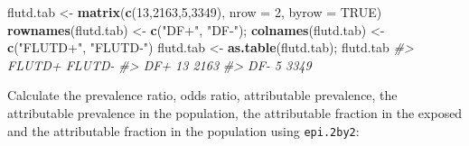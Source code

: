 \documentclass[
]{article}
\newenvironment{Shaded}{\begin{snugshade}}{\end{snugshade}}
\newcommand{\CommentTok}[1]{\textcolor[rgb]{0.56,0.35,0.01}{\textit{#1}}}
\newcommand{\DataTypeTok}[1]{\textcolor[rgb]{0.13,0.29,0.53}{#1}}
\newcommand{\DecValTok}[1]{\textcolor[rgb]{0.00,0.00,0.81}{#1}}
\newcommand{\KeywordTok}[1]{\textcolor[rgb]{0.13,0.29,0.53}{\textbf{#1}}}
\newcommand{\NormalTok}[1]{#1}
\newcommand{\OtherTok}[1]{\textcolor[rgb]{0.56,0.35,0.01}{#1}}
\newcommand{\StringTok}[1]{\textcolor[rgb]{0.31,0.60,0.02}{#1}}
\begin{document}
\begin{Shaded}
\begin{Highlighting}[]
\NormalTok{flutd.tab \textless{}{-}}\StringTok{ }\KeywordTok{matrix}\NormalTok{(}\KeywordTok{c}\NormalTok{(}\DecValTok{13}\NormalTok{,}\DecValTok{2163}\NormalTok{,}\DecValTok{5}\NormalTok{,}\DecValTok{3349}\NormalTok{), }\DataTypeTok{nrow =} \DecValTok{2}\NormalTok{, }\DataTypeTok{byrow =} \OtherTok{TRUE}\NormalTok{)}
\KeywordTok{rownames}\NormalTok{(flutd.tab) \textless{}{-}}\StringTok{ }\KeywordTok{c}\NormalTok{(}\StringTok{"DF+"}\NormalTok{, }\StringTok{"DF{-}"}\NormalTok{); }\KeywordTok{colnames}\NormalTok{(flutd.tab) \textless{}{-}}\StringTok{ }\KeywordTok{c}\NormalTok{(}\StringTok{"FLUTD+"}\NormalTok{, }\StringTok{"FLUTD{-}"}\NormalTok{)}
\NormalTok{flutd.tab \textless{}{-}}\StringTok{ }\KeywordTok{as.table}\NormalTok{(flutd.tab); flutd.tab}
\CommentTok{\#\textgreater{}     FLUTD+ FLUTD{-}}
\CommentTok{\#\textgreater{} DF+     13   2163}
\CommentTok{\#\textgreater{} DF{-}      5   3349}
\end{Highlighting}
\end{Shaded}

Calculate the prevalence ratio, odds ratio, attributable prevalence, the
attributable prevalence in the population, the attributable fraction in
the exposed and the attributable fraction in the population using
\texttt{epi.2by2}:
\end{document}
